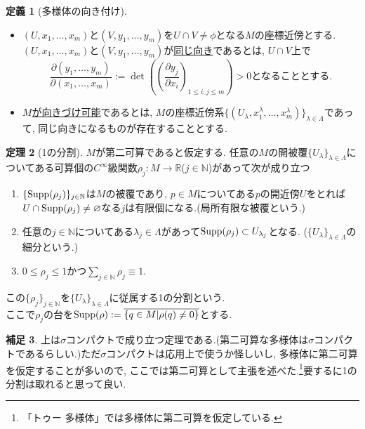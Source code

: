\documentclass[dvipdfmx,a4paper,11pt]{article}
\newcommand{\R}{\mathbb{R}}
\newcommand{\N}{\mathbb{N}}
\newcommand{\Supp}{{\rm Supp}}
\theoremstyle{definition}
\newtheorem{thm}{定理}
\newtheorem{dfn}[thm]{定義}
\newtheorem{rem}[thm]{補足}
\newcommand{\pdrv}[2]{\frac{\partial #1}{\partial #2}}
\begin{document}
 \begin{tcolorbox}[
    colback = white,
    colframe = green!35!black,
    fonttitle = \bfseries,
    breakable = true]
\begin{dfn}[多様体の向き付け]
\text{}

\begin{itemize}
 \setlength{\parskip}{0cm}
  \setlength{\itemsep}{2pt} 
\item $(U, x_1, \ldots, x_m)$と$(V, y_1, \ldots, y_m)$を$U \cap V \neq \phi$となる$M$の座標近傍とする.
$(U, x_1, \ldots, x_m)$と$(V, y_1, \ldots, y_m)$が\underline{同じ向き}であるとは, $U \cap V$上で
$$
\pdrv{(y_1, \ldots, y_m)}{(x_1, \ldots, x_m)}:=\det(\left( \pdrv{y_j}{x_i} \right)_{1\le i,j \le m}) >0
\text{となることとする.}
$$
\item \underline{$M$が向きづけ可能}であるとは, $M$の座標近傍系$\{ (U_{\lambda}, x_{1}^{\lambda}, \ldots, x_{m}^{\lambda})\}_{\lambda \in \Lambda}$であって, 同じ向きになるものが存在することとする.
\end{itemize}
    \end{dfn}
    \end{tcolorbox} 
    
    
 \begin{tcolorbox}[
    colback = white,
    colframe = green!35!black,
    fonttitle = \bfseries,
    breakable = true]
\begin{thm}[1の分割]
$M$が第二可算であると仮定する.
任意の$M$の開被覆$\{U_{\lambda}\}_{\lambda \in \Lambda}$についてある可算個の$C^{\infty}$級関数$\rho_{j} : M \rightarrow \R$($j \in \N$)があって次が成り立つ
\begin{enumerate}
 \setlength{\parskip}{0cm}
  \setlength{\itemsep}{2pt} 
\item $\{ \Supp(\rho_{j})\}_{j \in \N}$は$M$の被覆であり, $p \in M$についてある$p$の開近傍$U$をとれば$U \cap \Supp(\rho_{j}) \neq \varnothing$なる$j$は有限個になる.(局所有限な被覆という.)
\item 任意の$j \in \N$についてある$\lambda_{j} \in \Lambda$があって$\Supp(\rho_{j}) \subset U_{\lambda_j}$となる. ($\{U_{\lambda}\}_{\lambda \in \Lambda}$の細分という.)
\item $0 \le \rho_j \le 1$かつ$\sum_{j \in \N} \rho_{j} \equiv 1$.
\end{enumerate}
この$\{ \rho_{j} \}_{j \in \N}$を$\{U_{\lambda}\}_{\lambda \in \Lambda}$に従属する1の分割という. \\
ここで$\rho_j$の台を${\rm Supp}(\rho) :=\overline{\{q \in M | \rho(q) \neq 0 \}}$とする. 
     \end{thm}
    \end{tcolorbox} 
\begin{rem}
上は$\sigma$コンパクトで成り立つ定理である.(第二可算な多様体は$\sigma$コンパクトであるらしい.)ただ$\sigma$コンパクトは応用上で使うか怪しいし, 多様体に第二可算を仮定することが多いので, ここでは第二可算として主張を述べた.\footnote{「トゥー 多様体」では多様体に第二可算を仮定している.}要するに1の分割は取れると思って良い. 
\end{rem}
\end{document}
